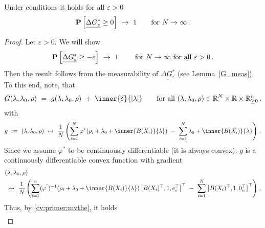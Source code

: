  \begin{lemma}
   \label{bw:cd:lem2}
   Under conditions it holds
   for all $\varepsilon>0$
\begin{gather}
   \P
   \left[ 
     \underline{
     \Delta G^*
     _\varepsilon
     }
     \ge 
     0
   \right]
   \ 
   \to
   \ 
   1
   \qquad
   \text{for}
   \ 
   N\to\infty
   \,.
\end{gather}
 \end{lemma}
 \begin{proof}
   Let $\varepsilon>0$.
   We will show
\begin{gather}
   \P
   \left[ 
     \underline{
     \Delta G^*
     _\varepsilon
     }
     \ge 
     -\tilde{\varepsilon}
   \right]
   \ 
   \to
   \ 
   1
   \qquad
   \ 
   \text{for}
   \ 
   N\to\infty
   \ 
   \text{for all}\ 
   \tilde{\varepsilon}>0
   \,.
\end{gather}
Then the result follows from the measurability of 
$
     \underline{
     \Delta G^*
     _\varepsilon
     }
$
(see Lemma~\ref{G_meas}).
To this end, note, that
\begin{gather*}
  G(\lambda,\lambda_0,\rho)
  \ 
  =
  \ 
  g(\lambda,\lambda_0,\rho)
  \ 
  +
  \ 
  \inner{\delta}{|\lambda|}
  \qquad
  \text{for all}\ 
  (\lambda,\lambda_0,\rho)
  \in
  \R^{N}
  \times
  \R
  \times
  \R^n_{\ge 0}
  \,,
\end{gather*}
with
\begin{gather*}
  g
  \ 
  :=
  \ 
  (\lambda,\lambda_0,\rho)
  \ 
  \mapsto
  \ 
     \frac{1}{N}
     \left( 
\sum_{i=1} 
  ^N
  \varphi^*
  \!
  \left( 
    \rho_i
    +
\lambda_0
+
\inner
{B(X_i)}
{
\lambda
}
  \right)
  \ 
  -
\ 
\sum_{i=1}^{N} 
\lambda_0
+
\inner
{B(X_i)}
{
\lambda
}
     \right)
  \,.
\end{gather*}
Since we assume $\varphi^*$ to be continuously differentiable (it is always convex),
$g$ is a continuously differentiable convex function with gradient
\begin{align*}
  &
  (\lambda,\lambda_0,\rho)
  \\
  &
  \ 
  \mapsto
  \ 
     \frac{1}{N}
     \left( 
\sum_{i=1} 
  ^n
  (
  \varphi^{'}
  )
  ^{-1}
  \!
  \left( 
    \rho_i
    +
\lambda_0
+
\inner
{B(X_i)}
{
\lambda
}
  \right)
  \left[ 
    B(X_i)^\top,1,e_i^\top
  \right]^\top
  \ 
  -
  \ 
  \sum_{i=1}^{N} 
  \left[ 
    B(X_i)^\top,1,0_n^\top
  \right]^\top
     \right)
  \,.
\end{align*}
Thus, by \eqref{cv:primer:mvthe},
it holds
\begin{align*}

\end{align*}
\end{proof}
